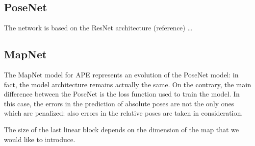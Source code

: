 \subsection{PoseNet}
The network is based on the ResNet architecture (reference)
\dots

\subsection{MapNet}
The MapNet model for APE represents an evolution of the PoseNet model: in fact, the model architecture remains actually the same. On the contrary, the main difference between the PoseNet is the loss function used to train the model. In this case, the errors in the prediction of absolute poses are not the only ones which are penalized: also errors in the relative poses are taken in consideration.

The size of the last linear block depends on the dimension of the map that we would like to introduce.
